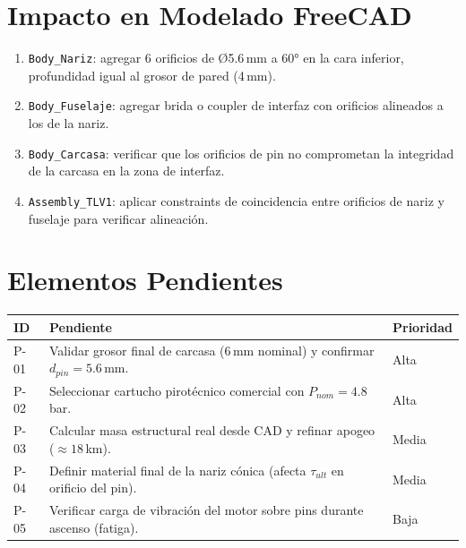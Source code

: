 \documentclass[11pt, a4paper]{article}
\begin{document}
\section{Impacto en Modelado FreeCAD}

\begin{enumerate}[leftmargin=*, itemsep=4pt]
  \item \texttt{Body\_Nariz}: agregar 6 orificios de Ø5.6\,mm a 60° en la cara inferior, profundidad igual al grosor de pared (4\,mm).
  \item \texttt{Body\_Fuselaje}: agregar brida o coupler de interfaz con orificios alineados a los de la nariz.
  \item \texttt{Body\_Carcasa}: verificar que los orificios de pin no comprometan la integridad de la carcasa en la zona de interfaz.
  \item \texttt{Assembly\_TLV1}: aplicar constraints de coincidencia entre orificios de nariz y fuselaje para verificar alineación.
\end{enumerate}

\section{Elementos Pendientes}

\vspace{6pt}
\begin{tabularx}{\linewidth}{lXl}
  \toprule
  \rowcolor{tlvnavy}
  \color{white}\textbf{ID} & \color{white}\textbf{Pendiente} & \color{white}\textbf{Prioridad} \\
  \midrule
  \rowcolor{tlvlight} P-01 & Validar grosor final de carcasa (6\,mm nominal) y confirmar $d_{pin} = 5.6$\,mm. & Alta \\
  P-02 & Seleccionar cartucho pirotécnico comercial con $P_{nom} = 4.8$\,bar. & Alta \\
  \rowcolor{tlvlight} P-03 & Calcular masa estructural real desde CAD y refinar apogeo ($\approx 18$\,km). & Media \\
  P-04 & Definir material final de la nariz cónica (afecta $\tau_{ult}$ en orificio del pin). & Media \\
  \rowcolor{tlvlight} P-05 & Verificar carga de vibración del motor sobre pins durante ascenso (fatiga). & Baja \\
  \bottomrule
\end{tabularx}
\end{document}
